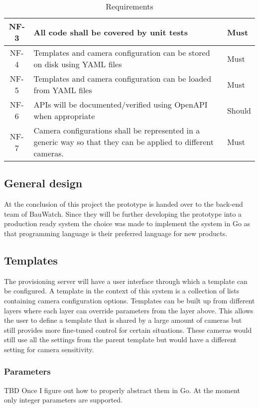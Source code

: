 \begin{table}[h]
\begin{tabulary}{\linewidth}{CLL}
        \\ \hline
        NF-3 & All code shall be covered by unit tests & Must
        \\ \hline
        NF-4 & Templates and camera configuration can be stored on disk using YAML files & Must
        \\ \hline
        NF-5 & Templates and camera configuration can be loaded from YAML files & Must
        \\ \hline %
        NF-6 & APIs will be documented/verified using OpenAPI when appropriate & Should
        \\ \hline
        NF-7 & Camera configurations shall be represented in a generic way so that they can be applied to different cameras. & Must
    \end{tabulary}
    \caption{Requirements}
    \label{tab:requirements}
\end{table}

\subsection{General design}
At the conclusion of this project the prototype is handed over to the back-end team of BauWatch.
Since they will be further developing the prototype into a production ready system the choice was made to implement the system in Go as that programming language is their preferred language for new products.

\subsection{Templates}
The provisioning server will have a user interface through which a template can be configured.
A template in the context of this system is a collection of lists containing camera configuration options.
Templates can be built up from different layers where each layer can override parameters from the layer above.
This allows the user to define a template that is shared by a large amount of cameras but still provides more fine-tuned control for certain situations.
These cameras would still use all the settings from the parent template but would have a different setting for camera sensitivity.

\subsubsection{Parameters}
TBD Once I figure out how to properly abstract them in Go.
At the moment only integer parameters are supported.

